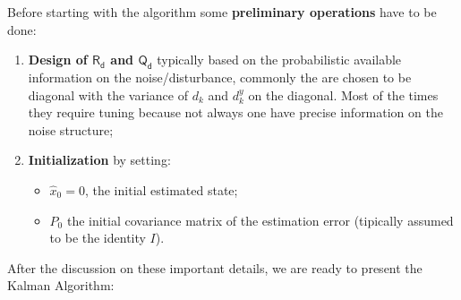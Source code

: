 \noindent
Before starting with the algorithm some \textbf{preliminary operations} have to be done:
\begin{enumerate}
    \itemsep-0.2em
    \item \textsf{\textbf{Design of $\mathsf{R_d}$ and $\mathsf{Q_d}$}} typically based on the probabilistic available information on the noise/disturbance, commonly the are chosen to be diagonal with the variance of $d_k$ and $d_k^y$ on the diagonal. Most of the times they require tuning because not always one have precise information on the noise structure;
    \item \textsf{ \textbf{Initialization}} by setting:
    \begin{itemize}
        \itemsep0em
        \item $\hat{x}_0=0$, the initial estimated state; 
        \item $P_0$ the initial covariance matrix of the estimation error (tipically assumed to be the identity $I$).
    \end{itemize}
\end{enumerate}
After the discussion on these important details, we are ready to present the \textsf{Kalman Algorithm}:\\

\hspace*{-5mm}
%


